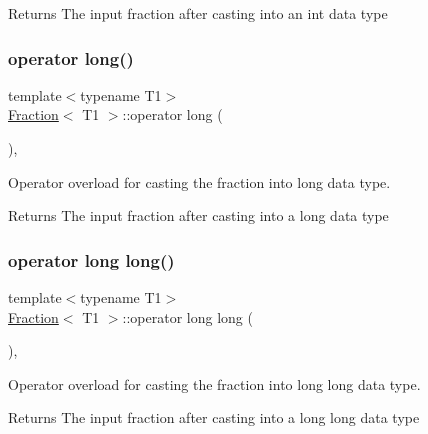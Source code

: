 \begin{DoxyReturn}{Returns}
The input fraction after casting into an int data type 
\end{DoxyReturn}
\mbox{\label{class_fraction_ae0f4610e5b81f7a1cd2e1c28aa239388}} 
\subsubsection{\texorpdfstring{operator long()}{operator long()}}
{\footnotesize\ttfamily template$<$typename T1$>$ \\
\mbox{\hyperlink{class_fraction}{Fraction}}$<$ T1 $>$\+::operator long (\begin{DoxyParamCaption}{ }\end{DoxyParamCaption})\hspace{0.3cm}{\ttfamily [inline]}, {\ttfamily [explicit]}}



Operator overload for casting the fraction into long data type. 

\begin{DoxyReturn}{Returns}
The input fraction after casting into a long data type 
\end{DoxyReturn}
\mbox{\label{class_fraction_acd3b6a968bac3ef1cebbc64536be3a41}} 
\subsubsection{\texorpdfstring{operator long long()}{operator long long()}}
{\footnotesize\ttfamily template$<$typename T1$>$ \\
\mbox{\hyperlink{class_fraction}{Fraction}}$<$ T1 $>$\+::operator long long (\begin{DoxyParamCaption}{ }\end{DoxyParamCaption})\hspace{0.3cm}{\ttfamily [inline]}, {\ttfamily [explicit]}}



Operator overload for casting the fraction into long long data type. 

\begin{DoxyReturn}{Returns}
The input fraction after casting into a long long data type 
\end{DoxyReturn}
\mbox{\label{class_fraction_aa1f6ad93978f3dc5b403a568070099c6}} 
